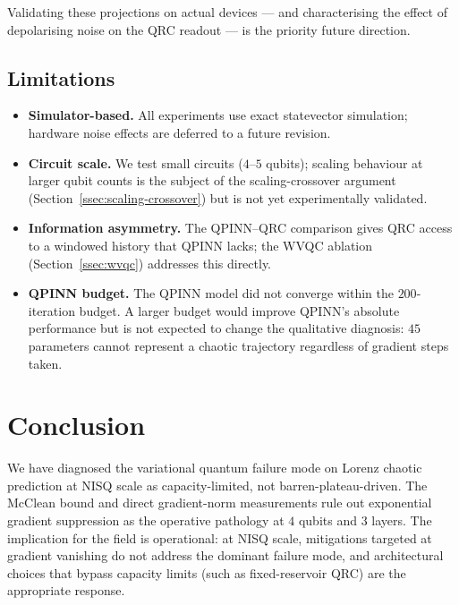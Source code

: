 \documentclass[11pt,a4paper]{article}
\begin{document}
Validating these projections on actual devices --- and characterising
the effect of depolarising noise on the QRC readout --- is the
priority future direction.

\subsection{Limitations}
\label{sec:limitations}

\begin{itemize}
  \item \textbf{Simulator-based.} All experiments use exact
        statevector simulation; hardware noise effects are deferred
        to a future revision.
  \item \textbf{Circuit scale.} We test small circuits ($4$--$5$
        qubits); scaling behaviour at larger qubit counts is the
        subject of the scaling-crossover argument
        (Section~\ref{ssec:scaling-crossover}) but is not yet
        experimentally validated.
  \item \textbf{Information asymmetry.} The QPINN--QRC comparison
        gives QRC access to a windowed history that QPINN lacks;
        the WVQC ablation (Section~\ref{ssec:wvqc}) addresses this
        directly.
  \item \textbf{QPINN budget.} The QPINN model did not converge
        within the $200$-iteration budget. A larger budget would
        improve QPINN's absolute performance but is not expected
        to change the qualitative diagnosis: $45$ parameters
        cannot represent a chaotic trajectory regardless of
        gradient steps taken.
\end{itemize}

\section{Conclusion}

We have diagnosed the variational quantum failure mode on Lorenz
chaotic prediction at NISQ scale as capacity-limited, not
barren-plateau-driven. The McClean bound and direct gradient-norm
measurements rule out exponential gradient suppression as the
operative pathology at $4$ qubits and $3$ layers. The implication
for the field is operational: at NISQ scale, mitigations targeted at
gradient vanishing do not address the dominant failure mode, and
architectural choices that bypass capacity limits (such as
fixed-reservoir QRC) are the appropriate response.
\end{document}

